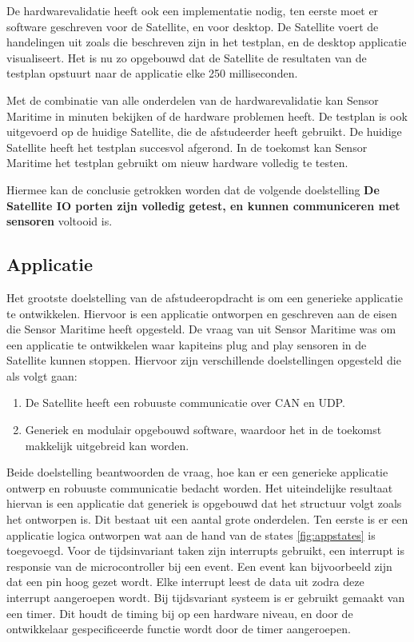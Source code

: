 \noindent De hardwarevalidatie heeft ook een implementatie nodig, ten eerste moet er software geschreven voor de Satellite, en voor desktop. De Satellite voert de handelingen uit zoals die beschreven zijn in het testplan, en de desktop applicatie visualiseert. Het is nu zo opgebouwd dat de Satellite de resultaten van de testplan opstuurt naar de applicatie elke 250 milliseconden. \newline

\noindent Met de combinatie van alle onderdelen van de hardwarevalidatie kan Sensor Maritime in minuten bekijken of de hardware problemen heeft. De testplan is ook uitgevoerd op de huidige Satellite, die de afstudeerder heeft gebruikt. De huidige Satellite heeft het testplan succesvol afgerond. In de toekomst kan Sensor Maritime het testplan gebruikt om nieuw hardware volledig te testen. \newline

\noindent Hiermee kan de conclusie getrokken worden dat de volgende doelstelling \textbf{De Satellite IO porten zijn volledig getest, en kunnen communiceren met sensoren} voltooid is.

\subsection{Applicatie}
Het grootste doelstelling van de afstudeeropdracht is om een generieke applicatie te ontwikkelen. Hiervoor is een applicatie ontworpen en geschreven aan de eisen die Sensor Maritime heeft opgesteld. De vraag van uit Sensor Maritime was om een applicatie te ontwikkelen waar kapiteins plug and play sensoren in de Satellite kunnen stoppen. Hiervoor zijn verschillende doelstellingen opgesteld die als volgt gaan:
\begin{enumerate}
	\item De Satellite heeft een robuuste communicatie over CAN en UDP.
	\item Generiek en modulair opgebouwd software, waardoor het in de toekomst makkelijk uitgebreid kan worden.
\end{enumerate}

\noindent Beide doelstelling beantwoorden de vraag, hoe kan er een generieke applicatie ontwerp en robuuste communicatie bedacht worden. Het uiteindelijke resultaat hiervan is een applicatie dat generiek is opgebouwd dat het structuur volgt zoals het ontworpen is. Dit bestaat uit een aantal grote onderdelen. Ten eerste is er een applicatie logica ontworpen wat aan de hand van de states \ref{fig:appstates} is toegevoegd. Voor de tijdsinvariant taken zijn interrupts gebruikt, een interrupt is responsie van de microcontroller bij een event. Een event kan bijvoorbeeld zijn dat een pin hoog gezet wordt. Elke interrupt leest de data uit zodra deze interrupt aangeroepen wordt. Bij tijdsvariant systeem is er gebruikt gemaakt van een timer. Dit houdt de timing bij op een hardware niveau, en door de ontwikkelaar gespecificeerde functie wordt door de timer aangeroepen. \newline

